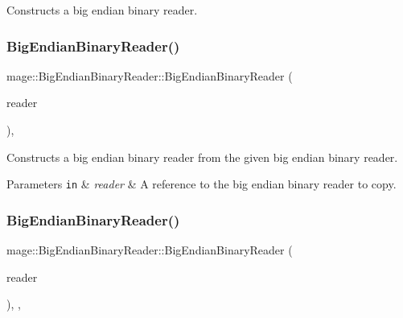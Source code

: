 Constructs a big endian binary reader. \hypertarget{classmage_1_1_big_endian_binary_reader_a9d490263268290217ae4f2f06e0699c4}{}\label{classmage_1_1_big_endian_binary_reader_a9d490263268290217ae4f2f06e0699c4} 
\subsubsection{\texorpdfstring{Big\+Endian\+Binary\+Reader()}{BigEndianBinaryReader()}\hspace{0.1cm}{\footnotesize\ttfamily [2/3]}}
{\footnotesize\ttfamily mage\+::\+Big\+Endian\+Binary\+Reader\+::\+Big\+Endian\+Binary\+Reader (\begin{DoxyParamCaption}\item[{const \hyperlink{classmage_1_1_big_endian_binary_reader}{Big\+Endian\+Binary\+Reader} \&}]{reader }\end{DoxyParamCaption})\hspace{0.3cm}{\ttfamily [protected]}, {\ttfamily [delete]}}

Constructs a big endian binary reader from the given big endian binary reader.


\begin{DoxyParams}[1]{Parameters}
\mbox{\tt in}  & {\em reader} & A reference to the big endian binary reader to copy. \\
\hline
\end{DoxyParams}
\hypertarget{classmage_1_1_big_endian_binary_reader_a16c4303dfb333ebdddfc07c924b9735a}{}\label{classmage_1_1_big_endian_binary_reader_a16c4303dfb333ebdddfc07c924b9735a} 
\subsubsection{\texorpdfstring{Big\+Endian\+Binary\+Reader()}{BigEndianBinaryReader()}\hspace{0.1cm}{\footnotesize\ttfamily [3/3]}}
{\footnotesize\ttfamily mage\+::\+Big\+Endian\+Binary\+Reader\+::\+Big\+Endian\+Binary\+Reader (\begin{DoxyParamCaption}\item[{\hyperlink{classmage_1_1_big_endian_binary_reader}{Big\+Endian\+Binary\+Reader} \&\&}]{reader }\end{DoxyParamCaption})\hspace{0.3cm}{\ttfamily [protected]}, {\ttfamily [default]}, {\ttfamily [noexcept]}}

